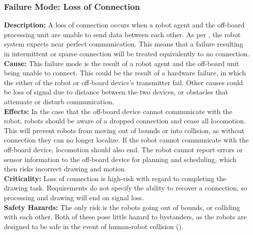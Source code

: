 \subsubsection{Failure Mode: Loss of Connection}
\label{sec:comm_fm_loss}
\textbf{Description:} A loss of connection occurs when a robot agent and the off-board processing unit are unable to send data between each other. As per , the robot system expects near perfect communication. This means that a failure resulting in intermittent or sparse connection will be treated equivalently to no connection. \\
\textbf{Cause:} This failure mode is the result of a robot agent and the off-board unit being unable to connect. This could be the result of a hardware failure, in which the either of the robot or off-board device's transmitter fail. Other causes could be loss of signal due to distance between the two devices, or obstacles that attenuate or disturb communication. \\
\textbf{Effects:} In the case that the off-board device cannot communicate with the robot, robots should be aware of a dropped connection and cease all locomotion. This will prevent robots from moving out of bounds or into collision, as without connection they can no longer localize. If the robot cannot communicate with the off-board device, locomotion should also end. The robot cannot report errors or sensor information to the off-board device for planning and scheduling, which then risks incorrect drawing and motion. \\
\textbf{Criticality:} Loss of connection is high-risk with regard to completing the drawing task. Requirements do not specify the ability to recover a connection, so processing and drawing will end on signal loss. \\
\textbf{Safety Hazards:} The only risk is the robots going out of bounds, or colliding with each other. Both of these pose little hazard to bystanders, as the robots are designed to be safe in the event of human-robot collision (). 

